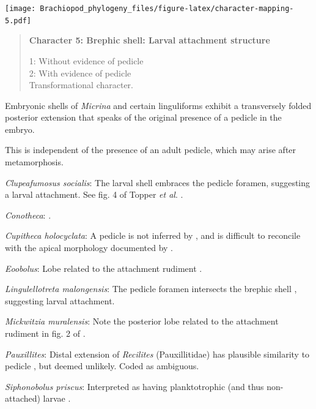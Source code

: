 \documentclass[openany]{book}
\begin{document}
\texttt{[image: Brachiopod\_phylogeny\_files/figure-latex/character-mapping-5.pdf]}

\begin{quote}
\textbf{Character 5: Brephic shell: Larval attachment structure}

1: Without evidence of pedicle\\
2: With evidence of pedicle\\
Transformational character.
\end{quote}

Embryonic shells of \emph{Micrina} and certain linguliforms exhibit a
transversely folded posterior extension that speaks of the original
presence of a pedicle in the embryo.

This is independent of the presence of an adult pedicle, which may arise
after metamorphosis.

\hypertarget{Clupeafumosus_socialis-coding-5}{}
\emph{Clupeafumosus socialis}: The larval shell embraces the pedicle
foramen, suggesting a larval attachment. See fig. 4 of Topper \emph{et
al}. \citeyearpar{Topper2013Reappraisalof}.

\hypertarget{Conotheca-coding-5}{}
\emph{Conotheca}: \citep{Wrona2003}.

\hypertarget{Cupitheca_holocyclata-coding-5}{}
\emph{Cupitheca holocyclata}: A pedicle is not inferred by
\citet{Skovsted2016}, and is difficult to reconcile with the apical
morphology documented by \citet{Sun2018}.

\hypertarget{Eoobolus-coding-5}{}
\emph{Eoobolus}: Lobe related to the attachment rudiment \citep[fig.
2]{Balthasar2009Thebrachiopod}.

\hypertarget{Lingulellotreta_malongensis-coding-5}{}
\emph{Lingulellotreta malongensis}: The pedicle foramen intersects the
brephic shell \citep{Holmer1997EarlyCambrian, Li2004}, suggesting larval
attachment.

\hypertarget{Mickwitzia_muralensis-coding-5}{}
\emph{Mickwitzia muralensis}: Note the posterior lobe related to the
attachment rudiment in fig. 2 of \citet{Balthasar2009Thebrachiopod}.

\hypertarget{Pauxillites-coding-5}{}
\emph{Pauxillites}: Distal extension of \emph{Recilites} (Pauxillitidae)
has plausible similarity to pedicle \citep{Dzik1978}, but deemed
unlikely. Coded as ambiguous.

\hypertarget{Siphonobolus_priscus-coding-5}{}
\emph{Siphonobolus priscus}: Interpreted as having planktotrophic (and
thus non-attached) larvae \citep{Popov2009Earlyontogeny}.
\end{document}
